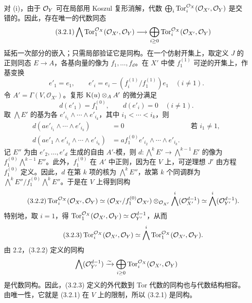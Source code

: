 对 (i)，由于 \(\mathcal O_Y\) 可在局部用 Koszul 复形消解，代数 \(\bigoplus_i\operatorname{Tor}_i^{\mathcal O_X}(\mathcal O_{X'},\mathcal O_Y)\) 是交错的。因此，存在唯一的代数同态
\begin{equation}\tag{3.2.1}
\bigwedge \operatorname{Tor}_1^{\mathcal O_X}(\mathcal O_{X'},\mathcal O_Y)
\longrightarrow
\bigoplus_{i\ge0}\operatorname{Tor}_i^{\mathcal O_X}(\mathcal O_{X'},\mathcal O_Y)
\end{equation}
延拓一次部分的嵌入；只需局部验证它是同构。在一个仿射开集上，取定义 \(J\) 的正则同态 \(E\to A\)，各基向量的像为 \(f_1,\ldots,f_d\)。在 \(X'\) 中使 \(f_1^{(1)}\) 可逆的开集上，作基变换
\[
e'_1=e_1,
\qquad
e'_i=e_i-(f_i^{(1)}/f_1^{(1)})e_1\quad(i\ne1).
\]
令 \(A'=\Gamma(V,\mathcal O_{X'})\)。复形 \(\mathrm K(u)\otimes_A A'\) 的微分满足
\[
 d(e'_1)=f_1^{(0)},\qquad d(e'_i)=0\quad(i\ne1).
\]
取 \(\bigwedge E'\) 的基为各 \(e'_{i_1}\wedge\cdots\wedge e'_{i_k}\)，其中 \(i_1<\cdots<i_k\)，则
\[
\begin{aligned}
 d(ae'_{i_1}\wedge\cdots\wedge e'_{i_k})&=0&&\text{若 }i_1\ne1,\\
 d(ae'_1\wedge e'_{i_2}\wedge\cdots\wedge e'_{i_k})
 &=af_1^{(0)}e'_{i_2}\wedge\cdots\wedge e'_{i_k}.
\end{aligned}
\]
记 \(E''\) 为由 \(e'_2,\ldots,e'_d\) 生成的自由 \(A'\)-模，则
\(d:\bigwedge^kE'\to\bigwedge^{k-1}E'\) 的像为
\(f_1^{(0)}\bigwedge^{k-1}E''\)。此外，\(f_1^{(0)}\) 在 \(A'\) 中正则，因为在 \(V\) 上，可逆理想 \(J'\) 由方程 \(f_1^{(0)}\) 定义。因此，\(d\) 在第 \(k\) 项的核为 \(\bigwedge^kE''\)，故第 \(k\) 个同调群为
\(\bigwedge^kE''/f_1^{(0)}\bigwedge^kE''\)。于是在 \(V\) 上得到同构
\begin{equation}\tag{3.2.2}
\operatorname{Tor}_i^{\mathcal O_X}(\mathcal O_{X'},\mathcal O_Y)
\simeq
(\mathcal O_{X'}/f_1^{(0)}\mathcal O_{X'})\otimes_{\mathcal O_{X'}}
\bigwedge^i(\mathcal O_{X'}^{d-1})
\simeq
\bigwedge^i(\mathcal O_{Y'}^{d-1}).
\end{equation}
特别地，取 \(i=1\)，得 \(\operatorname{Tor}_1^{\mathcal O_X}(\mathcal O_{X'},\mathcal O_Y)\simeq \mathcal O_{Y'}^{d-1}\)，从而
\begin{equation}\tag{3.2.3}
\operatorname{Tor}_i^{\mathcal O_X}(\mathcal O_{X'},\mathcal O_Y)
\simeq
\bigwedge^i\operatorname{Tor}_1^{\mathcal O_X}(\mathcal O_{X'},\mathcal O_Y).
\end{equation}
由 2.2，(3.2.2) 定义的同构
\[
 \bigwedge(\mathcal O_{Y'}^{d-1})\xrightarrow{\sim}
 \bigoplus_{i\geq0}\operatorname{Tor}_i^{\mathcal O_X}(\mathcal O_{X'},\mathcal O_Y)
\]
是代数同构。因此，(3.2.3) 定义的外代数到 Tor 代数的同构也与代数结构相容。由唯一性，它就是 (3.2.1) 在 \(V\) 上的限制，所以 (3.2.1) 是同构。

